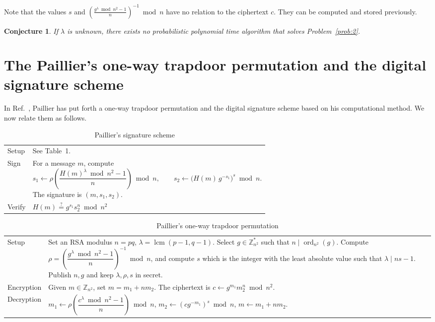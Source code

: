 \documentclass[11pt,a4paper]{article}
\newtheorem{conjecture}[definition]{Conjecture}
\theoremstyle{remark}
\newcommand{\Z}{\mathbb{Z}}
\newcommand{\ord}{\operatorname{ord}}
\newcommand{\lcm}{\operatorname{lcm}}
\begin{document}
Note that the values $s$ and $\left(\frac{g^\lambda \bmod n^2 - 1}{n}\right)^{-1} \bmod n$ have no relation to the ciphertext $c$. They can be computed and stored previously.

\begin{conjecture}\label{conj:prob2-hard}
If $\lambda$ is unknown, there exists no probabilistic polynomial time algorithm that solves Problem~\ref{prob:2}.
\end{conjecture}

\section{The Paillier's one-way trapdoor permutation and the digital signature scheme}\label{sec:signature}

In Ref.~\cite{Pai99}, Paillier has put forth a one-way trapdoor permutation and the digital signature scheme based on his computational method. We now relate them as follows.

\begin{table}[h]
\centering
\caption{Paillier's signature scheme}
\begin{tabular}{@{}l p{}@{}}
\toprule
Setup & See Table~1.\\
Sign & For a message $m$, compute
\[
s_1 \leftarrow \rho\left(\frac{H(m)^\lambda \bmod n^2 - 1}{n}\right) \bmod n, \qquad
s_2 \leftarrow \big(H(m)\,g^{-s_1}\big)^s \bmod n.
\]
The signature is $(m,s_1,s_2)$.\\
Verify & $H(m) \overset{?}{=} g^{s_1} s_2^n \bmod n^2$\\
\bottomrule
\end{tabular}
\end{table}

\begin{table}[h]
\centering
\caption{Paillier's one-way trapdoor permutation}
\begin{tabular}{@{}l p{}@{}}
\toprule
Setup & Set an RSA modulus $n=pq$, $\lambda=\lcm(p-1,q-1)$. Select $g\in\Z_{n^2}^*$ such that $n\mid\ord_{n^2}(g)$. Compute
$\rho = \left(\dfrac{g^\lambda \bmod n^2 - 1}{n}\right)^{-1} \bmod n$, and compute $s$ which is the integer with the least absolute value such that $\lambda \mid ns-1$. Publish $n,g$ and keep $\lambda,\rho,s$ in secret.\\
Encryption & Given $m\in\Z_{n^2}$, set $m=m_1+nm_2$. The ciphertext is $c \leftarrow g^{m_1} m_2^n \bmod n^2$.\\
Decryption & $m_1 \leftarrow \rho\left(\dfrac{c^\lambda \bmod n^2 - 1}{n}\right) \bmod n$, \quad $m_2 \leftarrow (cg^{-m_1})^s \bmod n$, \quad $m \leftarrow m_1 + nm_2$.\\
\bottomrule
\end{tabular}
\end{table}
\end{document}
